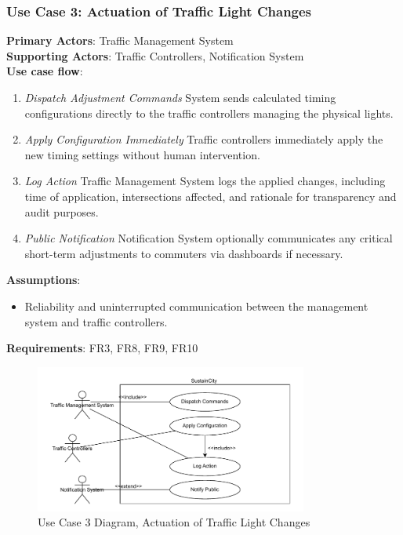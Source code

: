 \documentclass[a4paper,12pt]{article}
\begin{document}
\subsubsection*{Use Case 3: Actuation of Traffic Light Changes}
\textbf{Primary Actors}: Traffic Management System \\
\textbf{Supporting Actors}: Traffic Controllers, Notification System \\
\textbf{Use case flow}: 
\begin{enumerate}
    \item \textit{Dispatch Adjustment Commands} System sends calculated timing configurations directly to the traffic controllers managing the physical lights.
    \item \textit{Apply Configuration Immediately} Traffic controllers immediately apply the new timing settings without human intervention.
    \item \textit{Log Action} Traffic Management System logs the applied changes, including time of application, intersections affected, and rationale for transparency and audit purposes.
    \item \textit{Public Notification} Notification System optionally communicates any critical short-term adjustments to commuters via dashboards if necessary.
\end{enumerate}
\textbf{Assumptions}: 
\begin{itemize}
    \item Reliability and uninterrupted communication between the management system and traffic controllers.
\end{itemize}
\textbf{Requirements}: FR3, FR8, FR9, FR10
\\
\begin{figure}[h]
    \centering
    \includegraphics[width=0.8\textwidth]{diagrams/Actuation_of_Traffic_Light_Changes.drawio.pdf}
    \caption{Use Case 3 Diagram, Actuation of Traffic Light Changes}
    \label{fig:Actuation_of_Traffic_Light_Changes.drawio}
\end{figure}
\\
\end{document}
